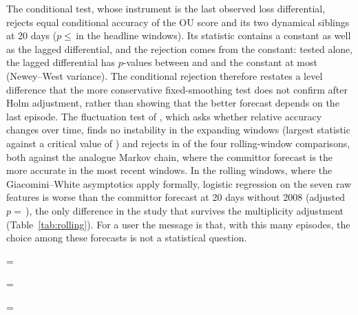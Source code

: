 \documentclass[preprint,12pt,authoryear]{elsarticle}
\newcommand{\fittable}[1]{\begingroup\setbox0=\hbox{#1}\ifdim\wd0>\textwidth\resizebox{\textwidth}{!}{\box0}\else\box0\fi\endgroup}
\begin{document}
The conditional test, whose instrument is the last observed loss differential, rejects equal conditional accuracy of the OU score and its two dynamical siblings at 20 days ($p\le\,$\GWmax in the headline windows). Its statistic contains a constant as well as the lagged differential, and the rejection comes from the constant: tested alone, the lagged differential has $p$-values between \GWslopeMin and \GWslopeMax and the constant at most \GWconstMax (Newey--West variance). The conditional rejection therefore restates a level difference that the more conservative fixed-smoothing test does not confirm after Holm adjustment, rather than showing that the better forecast depends on the last episode. The fluctuation test of \citet{giacomini2010}, which asks whether relative accuracy changes over time, finds no instability in the expanding windows (largest statistic \GRmaxExp against a critical value of \GRcrit) and rejects in \GRreject of the four rolling-window comparisons, both against the analogue Markov chain, where the committor forecast is the more accurate in the most recent windows. In the rolling windows, where the Giacomini--White asymptotics apply formally, logistic regression on the seven raw features is worse than the committor forecast at 20 days without 2008 (adjusted $p=\,$\HolmRoll), the only difference in the study that survives the multiplicity adjustment (Table~\ref{tab:rolling}). For a user the message is that, with this many episodes, the choice among these forecasts is not a statistical question.

\begin{table}[t]\centering\small
\caption{Sample sizes, event days and independent event episodes (event days no more than $h$ trading days apart).}\label{tab:samples}
\fittable{}\end{table}

\begin{table}[t]\centering\small
\caption{Difference in Brier skill, comparator minus recalibrated committor forecast (positive: comparator better), expanding windows, with 90\% moving-block-bootstrap intervals (blocks of $2h$ days; other block lengths in Table~\ref{tab:blocks}).}\label{tab:dbss}
\fittable{}\end{table}

\begin{table}[t]\centering\small
\caption{Tests against the recalibrated committor forecast, expanding windows: Holm-adjusted fixed-smoothing (EWC) tests of equal accuracy, Giacomini--White conditional tests (Newey--West variance), and model-confidence-set $p$-values (a model is in the 90\% set if its $p$-value is at least 0.10; all eight families in Table~\ref{tab:mcsall}).}\label{tab:tests}
\fittable{}\end{table}
\end{document}
